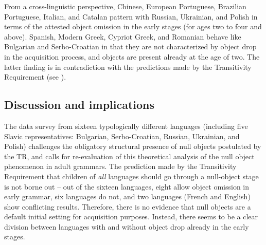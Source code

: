 \documentclass[output=paper,
modfonts,
newtxmath,
hidelinks,
]{langscibook}
\begin{document}
From a cross-linguistic perspective, 
Chinese, 
European Portuguese, Brazilian Por\-tu\-guese, 
Italian, and Catalan pattern with Russian, Ukrainian, and Polish in terms of the attested object omission in the early stages (for ages two to four and above). Spanish, Modern Greek, Cypriot Greek, and Romanian behave like Bulgarian and Serbo-Croatian in that they are not characterized by object drop in the acquisition process, and objects are present already at the age of two. The latter finding is in contradiction with the predictions made by the Transitivity Requirement (see ).

\subsection{Discussion and implications}\label{17:sec:key:3.3}

The data survey from sixteen typologically different languages (including five Slavic representatives: Bulgarian, Serbo-Croatian, Russian, Ukrainian, and Polish) challenges the obligatory structural presence of null objects postulated by the TR, and calls for re-evaluation of this theoretical analysis of the null object phenomenon in adult grammars. The prediction made by the Transitivity Requirement that children of \textit{all} languages should go through a null-object stage is not borne out -- out of the sixteen languages, eight allow object omission in early grammar, six languages do not, and two languages (French and English) show conflicting results. Therefore, there is no evidence that null objects are a default initial setting for acquisition purposes. Instead, there seems to be a clear division between languages with and without object drop already in the early stages.
\end{document}
